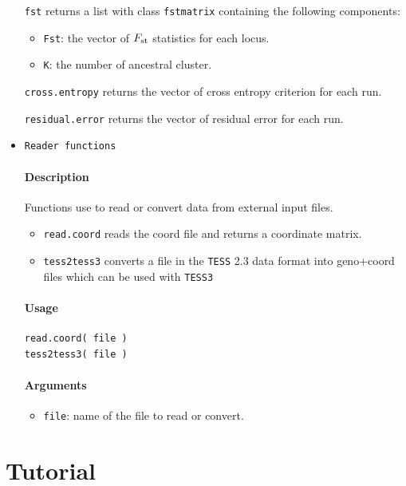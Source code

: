 \documentclass[10pt,a4paper]{article}
\begin{document}
\begin{itemize}
\verb|fst| returns a list with class \verb|fstmatrix| containing the following components: 

\begin{itemize}
\item \verb|Fst|: the vector of $F_{\rm st}$ statistics for each locus.
\item \verb|K|: the number of ancestral cluster.
\end{itemize}

\verb|cross.entropy| returns the vector of cross entropy criterion for each run.

\verb|residual.error| returns the vector of residual error for each run.

\item \verb|Reader functions|

\paragraph{Description}
Functions use to read or convert data from external input files.

\begin{itemize}
  \item[] \verb|read.coord| reads the coord file and returns a  coordinate matrix.
  \item[] \verb|tess2tess3| converts a file in the {\tt TESS} 2.3 data format into geno+coord files which can be used with {\tt TESS3}
\end{itemize}

\paragraph{Usage}
\begin{verbatim}
read.coord( file )
tess2tess3( file )
\end{verbatim}
\paragraph{Arguments}
\begin{itemize}
\item \verb|file|: name of the file to read or convert.
\end{itemize}


\end{itemize}





\section{Tutorial}
\end{document}
